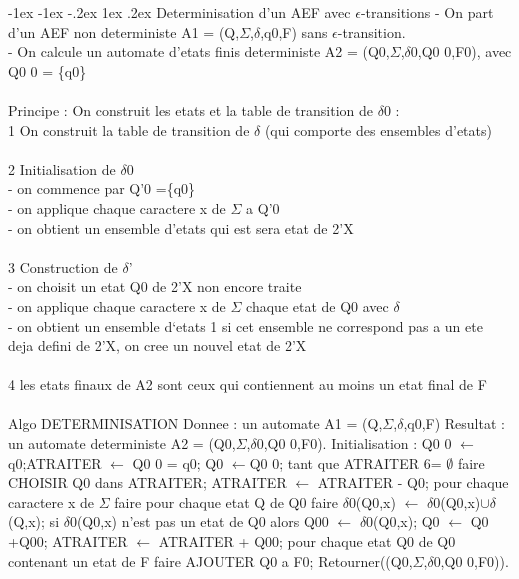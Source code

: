 \documentclass[5pt]{article}
\makeatletter
\renewcommand{\subsubsection}{\@startsection {section}{1}{\z@}%
             {-1ex \@plus -1ex \@minus -.2ex}%
             {1ex \@plus.2ex}%
             {\normalfont\scriptsize\sffamily\bfseries}}
\makeatother
\begin{document}
\begin{scriptsize}
\subsubsection{Determinisation d'un AEF avec $\epsilon$-transitions}
- On part d’un AEF non deterministe A1 = (Q,$\Sigma$,$\delta$,q0,F) sans $\epsilon$-transition.\\
- On calcule un automate d’etats finis deterministe A2 = (Q0,$\Sigma$,$\delta$0,Q0 0,F0), avec Q0 0 = \{q0\}\\
\\
Principe : On construit les etats et la table de transition de $\delta$0 :\\
1 On construit la table de transition de $\delta$ (qui comporte des ensembles d’etats)\\
\\
2 Initialisation de $\delta$0\\
- on commence par Q'0 =\{q0\}\\
- on applique chaque caractere x de $\Sigma$ a Q'0\\
- on obtient un ensemble d’etats qui est sera etat de 2'X\\
\\
3 Construction de $\delta$'\\
- on choisit un etat Q0 de 2'X non encore traite\\
- on applique chaque caractere x de $\Sigma$ chaque etat de Q0 avec $\delta$\\
- on obtient un ensemble d‘etats 1 si cet ensemble ne correspond pas a un ete deja defini de 2'X, on cree un nouvel etat de 2'X\\
\\
4 les etats finaux de A2 sont ceux qui contiennent au moins un etat final de F\\
\\
Algo DETERMINISATION Donnee : un automate A1 = (Q,$\Sigma$,$\delta$,q0,F) Resultat : un automate deterministe A2 = (Q0,$\Sigma$,$\delta$0,Q0 0,F0). Initialisation : Q0 0 $\leftarrow${q0};ATRAITER $\leftarrow$ Q0 0 = {q0}; Q0 $\leftarrow${Q0 0}; tant que ATRAITER 6= $\emptyset$ faire CHOISIR Q0 dans ATRAITER; ATRAITER $\leftarrow$ ATRAITER - Q0; pour chaque caractere x de $\Sigma$ faire pour chaque etat Q de Q0 faire $\delta$0(Q0,x) $\leftarrow$ $\delta$0(Q0,x)$\cup\delta$(Q,x); si $\delta$0(Q0,x) n’est pas un etat de Q0 alors Q00 $\leftarrow$ $\delta$0(Q0,x); Q0 $\leftarrow$ Q0 +{Q00}; ATRAITER $\leftarrow$ ATRAITER + {Q00}; pour chaque etat Q0 de Q0 contenant un etat de F faire AJOUTER Q0 a F0; Retourner((Q0,$\Sigma$,$\delta$0,Q0 0,F0)).\\

\end{scriptsize}
\end{document}
